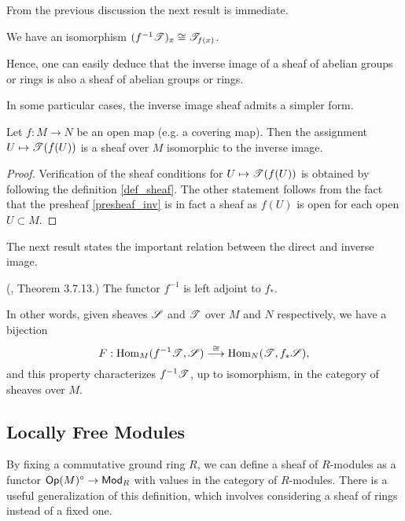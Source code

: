 From the previous discussion the next result is immediate.

\begin{proposition}
We have an isomorphism $(f^{-1}\mathscr{T})_x\cong \mathscr{T}_{f(x)}$.
\end{proposition}

Hence, one can easily deduce that the inverse image of a sheaf of abelian groups or rings is also a sheaf of abelian groups or rings.

In some particular cases, the inverse image sheaf admits a simpler form.

\begin{proposition}
Let $f:M\to N$ be an open map (e.g. a covering map). Then the assignment $U\mapsto \mathscr{T}(f(U))$ is a sheaf over $M$ isomorphic to the inverse image.
\end{proposition}
\begin{proof}
Verification of the sheaf conditions for $U\mapsto \mathscr{T}(f(U))$ is obtained by following the definition \ref{def_sheaf}. The other statement follows from the fact that the presheaf \eqref{presheaf_inv} is in fact a sheaf as $f(U)$ is open for each open $U\subset M$.
\end{proof}

The next result states the important relation between the direct and inverse image.

\begin{theorem}{\rm (\cite{tennison:_sheaf}, Theorem 3.7.13.)}\label{adjunction}
The functor $f^{-1}$ is left adjoint to $f_*$.
\end{theorem}

In other words, given sheaves $\mathscr{S}$ and $\mathscr{T}$ over $M$ and $N$ respectively, we have a bijection
$$F:\operatorname{Hom}_M(f^{-1}\mathscr{T},\mathscr{S})\stackrel{\cong}{\longrightarrow}\operatorname{Hom}_N(\mathscr{T},f_*\mathscr{S}),$$
and this property characterizes $f^{-1}\mathscr{T}$, up to isomorphism, in the category of sheaves over $M$.


\subsection{Locally Free Modules}
\label{modules}

By fixing a commutative ground ring $R$, we can define a sheaf of $R$-modules as a functor $\mathsf{Op}(M)^{\circ}\to \mathsf{Mod}_R$ with values in the category of $R$-modules. There is a useful generalization of this definition, which involves considering a sheaf of rings instead of a fixed one.

